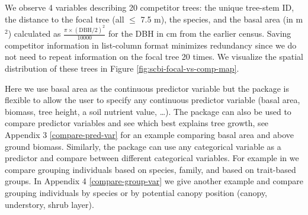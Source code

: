\documentclass[12pt]{article}
\newenvironment{Shaded}{\begin{snugshade}}{\end{snugshade}}
\newcommand{\CommentTok}[1]{\textcolor[rgb]{0.56,0.35,0.01}{\textit{#1}}}
\newcommand{\DataTypeTok}[1]{\textcolor[rgb]{0.13,0.29,0.53}{#1}}
\newcommand{\DecValTok}[1]{\textcolor[rgb]{0.00,0.00,0.81}{#1}}
\newcommand{\KeywordTok}[1]{\textcolor[rgb]{0.13,0.29,0.53}{\textbf{#1}}}
\newcommand{\NormalTok}[1]{#1}
\newcommand{\OperatorTok}[1]{\textcolor[rgb]{0.81,0.36,0.00}{\textbf{#1}}}
\newcommand{\StringTok}[1]{\textcolor[rgb]{0.31,0.60,0.02}{#1}}
\begin{document}
\begin{Shaded}
\end{Shaded}

We observe 4 variables describing 20 competitor trees: the unique
tree-stem ID, the distance to the focal tree (all \(\leq\) 7.5 m), the
species, and the basal area (in m\(^2\)) calculated as
\(\frac{\pi \times (\text{DBH/2})^2}{10000}\) for the DBH in cm from the
earlier census. Saving competitor information in list-column format
minimizes redundancy since we do not need to repeat information on the
focal tree 20 times. We visualize the spatial distribution of these
trees in Figure \ref{fig:scbi-focal-vs-comp-map}.

Here we use basal area as the continuous predictor variable but the
package is flexible to allow the user to specify any continuous
predictor variable (basal area, biomass, tree height, a soil nutrient
value, \dots). The package can also be used to compare predictor
variables and see which best explains tree growth, see Appendix 3
\ref{compare-pred-var} for an example comparing basal area and above
ground biomass. Similarly, the package can use any categorical variable
as a predictor and compare between different categorical variables. For
example in \citet{allen_permutation_2020} we compare grouping
individuals based on species, family, and based on trait-based groups.
In Appendix 4 \ref{compare-group-var} we give another example and
compare grouping individuals by species or by potential canopy position
(canopy, understory, shrub layer).
\end{document}
